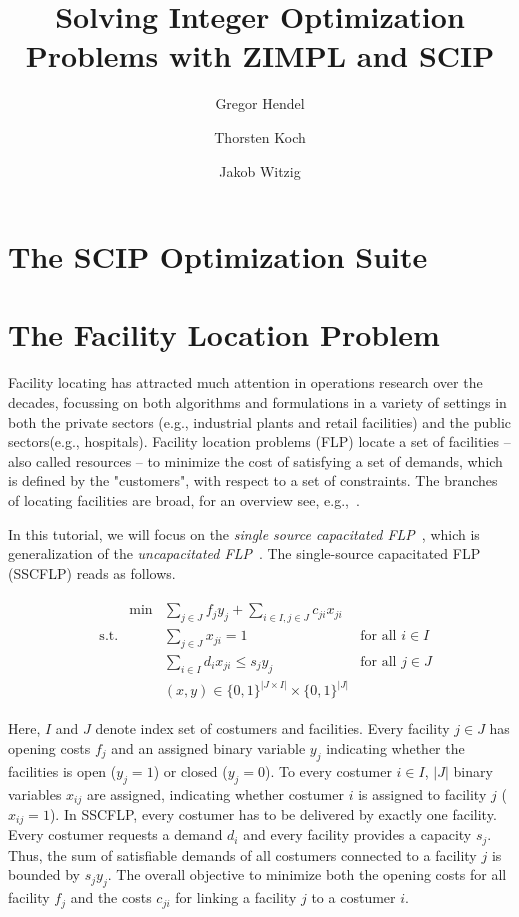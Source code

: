 \documentclass[a4paper,10pt]{article}
\title{Solving Integer Optimization Problems with ZIMPL and SCIP}
\author{Gregor Hendel\and
        Thorsten Koch\and
        Jakob Witzig}
\begin{document}
\maketitle

\section{The SCIP Optimization Suite}


\section{The Facility Location Problem}

Facility locating has attracted much attention in operations research over the decades,
focussing on both algorithms and formulations in a variety of settings in both the private sectors (e.g., industrial plants and retail facilities) and the public sectors(e.g., hospitals).
Facility location problems (FLP) locate a set of facilities -- also called resources -- to minimize the cost of satisfying a set of demands,
which is defined by the "customers", with respect to a set of constraints.
The branches of locating facilities are broad, for an overview see, e.g.,~\cite{aikens1985facility,brandeau1989overview}.

In this tutorial, we will focus on the \emph{single source capacitated FLP}~\cite{daskin1993new},
which is generalization of the \emph{uncapacitated FLP}~\cite{daskin1993toward}.
The single-source capacitated FLP (SSCFLP) reads as follows.

\begin{align}
%
\begin{aligned}
&           & \min & \sum\limits_{j \in J} f_{j} y_{j} + \sum\limits_{i\in I, j\in J} c_{ji} x_{ji} & \\
&\text{s.t.}&& \sum\limits_{j \in J} x_{ji} = 1 & \text{for all $i \in I$}\\
&           && \sum\limits_{i \in I} d_{i} x_{ji} \leq s_{j} y_{j} & \text{for all $j \in J$}\\
&           && (x,y) \in \{0,1\}^{|J \times I|} \times \{0,1\}^{|J|} &
\end{aligned}
\tag{SSCFLP}\label{eq:model}
\end{align}

Here, $I$ and $J$ denote index set of costumers and facilities.
Every facility $j \in J$ has opening costs $f_j$ and an assigned binary variable $y_j$
indicating whether the facilities is open ($y_j = 1$) or closed ($y_j = 0$).
To every costumer $i \in I$, $\vert J \vert$ binary variables $x_{ij}$ are assigned,
indicating whether costumer $i$ is assigned to facility $j$ ($x_{ij} = 1$).
In SSCFLP, every costumer has to be delivered by exactly one facility.
Every costumer requests a demand $d_i$ and every facility provides a capacity $s_j$.
Thus, the sum of satisfiable demands of all costumers connected to a facility $j$ is bounded by $s_jy_j$.
The overall objective to minimize both the opening costs for all facility $f_j$
and the costs $c_{ji}$ for linking a facility $j$ to a costumer $i$.
\end{document}
